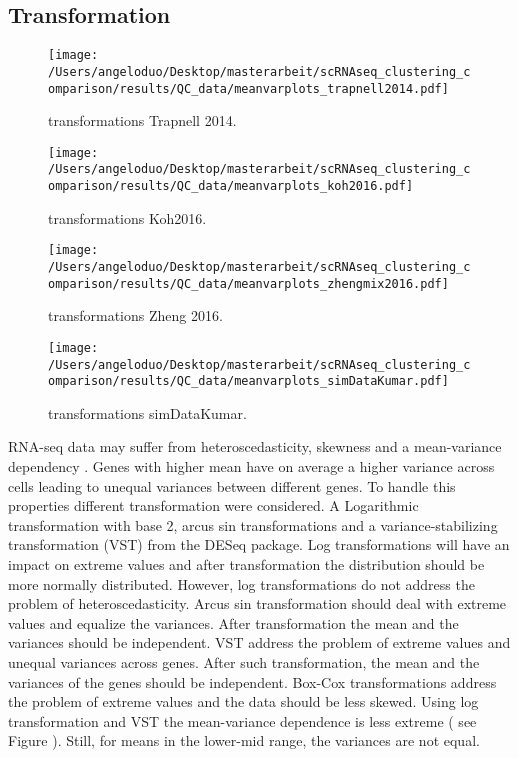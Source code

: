 \documentclass[11pt, a4paper]{article}\usepackage[]{graphicx}\usepackage[]{color}
\begin{document}
\subsection{Transformation}


\begin{figure}[!h]
\texttt{[image: /Users/angeloduo/Desktop/masterarbeit/scRNAseq\_clustering\_comparison/results/QC\_data/meanvarplots\_trapnell2014.pdf]}
\caption{transformations Trapnell 2014.}
\label{fig:transtrapnell}
\end{figure}

\begin{figure}[!h]
\texttt{[image: /Users/angeloduo/Desktop/masterarbeit/scRNAseq\_clustering\_comparison/results/QC\_data/meanvarplots\_koh2016.pdf]}
\caption{transformations Koh2016.}
\label{fig:transkoh}
\end{figure}

\begin{figure}[!h]
\texttt{[image: /Users/angeloduo/Desktop/masterarbeit/scRNAseq\_clustering\_comparison/results/QC\_data/meanvarplots\_zhengmix2016.pdf]}
\caption{transformations Zheng 2016.}
\label{fig:transzheng}
\end{figure}

\begin{figure}[!h]
\texttt{[image: /Users/angeloduo/Desktop/masterarbeit/scRNAseq\_clustering\_comparison/results/QC\_data/meanvarplots\_simDataKumar.pdf]}
\caption{transformations simDataKumar.}
\label{fig:transsim}
\end{figure}

RNA-seq data may suffer from heteroscedasticity, skewness and a mean-variance dependency \citep{zwiener2014transforming}. Genes with higher mean have on average a higher variance across cells leading to unequal variances between different genes. 
To handle this properties different transformation were considered. A Logarithmic transformation with base 2, arcus sin transformations and  a variance-stabilizing transformation (VST)\citep{huber2002variance} from the DESeq package. Log transformations will have an impact on extreme values and after transformation the distribution should be more normally distributed. However, log transformations do not address the problem of heteroscedasticity. Arcus sin transformation should deal with extreme values and equalize the variances. After transformation the mean and the variances should be independent. VST address the problem of extreme values and unequal variances across genes. After such transformation, the mean and the variances of the genes should be independent. Box-Cox transformations address the problem of extreme values and the data should be less skewed. Using log transformation and VST the mean-variance dependence is less extreme ( see Figure ). Still, for means in the lower-mid range, the variances are not equal. 
\end{document}
